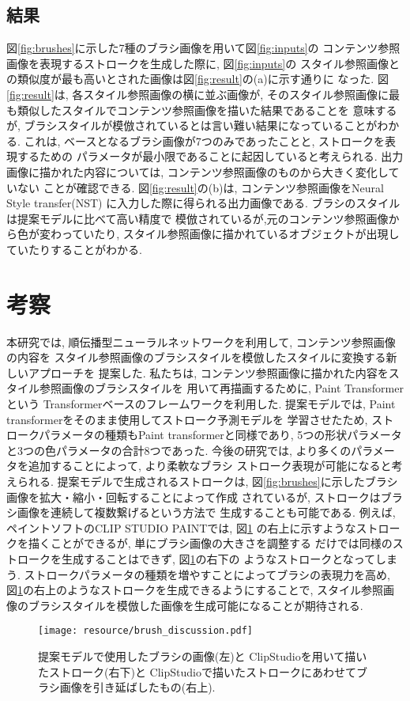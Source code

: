 \documentclass[MIRU,submit,uplatex]{miru2023j}
\begin{document}
\subsection{結果}
図\ref{fig:brushes}に示した7種のブラシ画像を用いて図\ref{fig:inputs}の
コンテンツ参照画像を表現するストロークを生成した際に, 図\ref{fig:inputs}の
スタイル参照画像との類似度が最も高いとされた画像は図\ref{fig:result}の(a)に示す通りに
なった. 図\ref{fig:result}は, 各スタイル参照画像の横に並ぶ画像が, 
そのスタイル参照画像に最も類似したスタイルでコンテンツ参照画像を描いた結果であることを
意味するが, ブラシスタイルが模倣されているとは言い難い結果になっていることがわかる. 
これは, ベースとなるブラシ画像が7つのみであったことと, ストロークを表現するための
パラメータが最小限であることに起因していると考えられる.
出力画像に描かれた内容については, コンテンツ参照画像のものから大きく変化していない
ことが確認できる.
図\ref{fig:result}の(b)は, コンテンツ参照画像をNeural Style transfer(NST) \cite{IST}
に入力した際に得られる出力画像である. ブラシのスタイルは提案モデルに比べて高い精度で
模倣されているが,元のコンテンツ参照画像から色が変わっていたり, 
スタイル参照画像に描かれているオブジェクトが出現していたりすることがわかる.


\section{考察}
本研究では, 順伝播型ニューラルネットワークを利用して, コンテンツ参照画像の内容を
スタイル参照画像のブラシスタイルを模倣したスタイルに変換する新しいアプローチを
提案した. 私たちは, コンテンツ参照画像に描かれた内容をスタイル参照画像のブラシスタイルを
用いて再描画するために, Paint Transformer \cite{PaintTransformer} という
Transformerベースのフレームワークを利用した. 
提案モデルでは, Paint transformerをそのまま使用してストローク予測モデルを
学習させたため, ストロークパラメータの種類もPaint transformerと同様であり,  
5つの形状パラメータと3つの色パラメータの合計8つであった. 
今後の研究では, より多くのパラメータを追加することによって, より柔軟なブラシ
ストローク表現が可能になると考えられる. 提案モデルで生成されるストロークは, 
図\ref{fig:brushes}に示したブラシ画像を拡大・縮小・回転することによって作成
されているが, ストロークはブラシ画像を連続して複数繋げるという方法で
生成することも可能である. 
例えば, ペイントソフトのCLIP STUDIO PAINT\cite{ClipStudio}では, 図\ref{fig:discussion}
の右上に示すようなストロークを描くことができるが, 単にブラシ画像の大きさを調整する
だけでは同様のストロークを生成することはできず, 図\ref{fig:discussion}の右下の
ようなストロークとなってしまう. 
ストロークパラメータの種類を増やすことによってブラシの表現力を高め, 
図\ref{fig:discussion}の右上のようなストロークを生成できるようにすることで, 
スタイル参照画像のブラシスタイルを模倣した画像を生成可能になることが期待される. 
\begin{figure}[t]
    \centering
    \texttt{[image: resource/brush\_discussion.pdf]}
    \caption{提案モデルで使用したブラシの画像(左)と
    ClipStudioを用いて描いたストローク(右下)と
    ClipStudioで描いたストロークにあわせてブラシ画像を引き延ばしたもの(右上).}
    \label{fig:discussion}
\end{figure}
%
\end{document}
